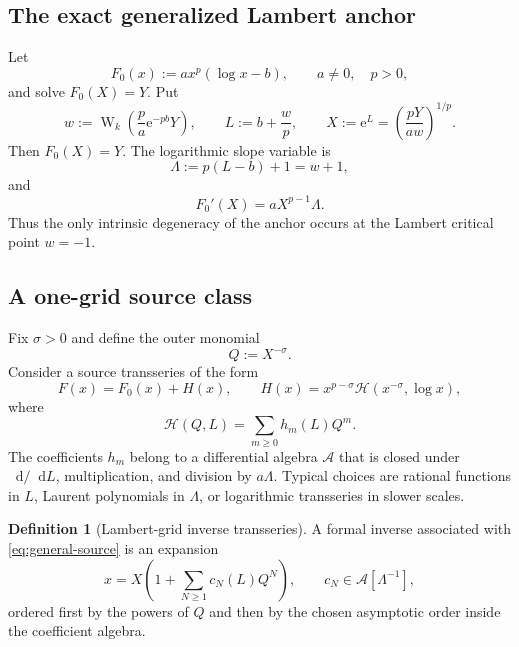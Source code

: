 \documentclass[11pt,oneside]{article}
\theoremstyle{plain}
\theoremstyle{definition}
\newtheorem{definition}[theorem]{Definition}
\theoremstyle{remark}
\newcommand{\W}{\operatorname{W}}
\newcommand{\e}{\mathrm{e}}
\newcommand{\dd}{\mathop{}\!\mathrm{d}}
\newcommand{\Acal}{\mathcal{A}}
\newcommand{\Hcal}{\mathcal{H}}
\begin{document}
\subsection{The exact generalized Lambert anchor}

Let
\begin{equation}
 F_0(x):=a x^p(\log x-b),
 \qquad a\ne0,\quad p>0,
 \label{eq:general-F0}
\end{equation}
and solve \(F_0(X)=Y\).  Put
\begin{equation}
 w:=\W_k\!\left(\frac{p}{a}\e^{-pb}Y\right),
 \qquad
 L:=b+\frac wp,
 \qquad
 X:=\e^L
      =\left(\frac{pY}{aw}\right)^{1/p}.
 \label{eq:general-anchor}
\end{equation}
Then \(F_0(X)=Y\).  The logarithmic slope variable is
\begin{equation}
 \Lambda:=p(L-b)+1=w+1,
 \label{eq:Lambda-def}
\end{equation}
and
\begin{equation}
 F_0'(X)=aX^{p-1}\Lambda.
 \label{eq:general-F0-prime}
\end{equation}
Thus the only intrinsic degeneracy of the anchor occurs at the Lambert
critical point \(w=-1\).

\subsection{A one-grid source class}

Fix \(\sigma>0\) and define the outer monomial
\begin{equation}
 Q:=X^{-\sigma}.
 \label{eq:general-Q}
\end{equation}
Consider a source transseries of the form
\begin{equation}
 F(x)=F_0(x)+H(x),
 \qquad
 H(x)=x^{p-\sigma}\Hcal(x^{-\sigma},\log x),
 \label{eq:general-source}
\end{equation}
where
\begin{equation}
 \Hcal(Q,L)=\sum_{m\ge0}h_m(L)Q^m.
 \label{eq:general-Hcal}
\end{equation}
The coefficients \(h_m\) belong to a differential algebra \(\Acal\) that is
closed under \(\dd/\dd L\), multiplication, and division by \(a\Lambda\).
Typical choices are rational functions in \(L\), Laurent polynomials in
\(\Lambda\), or logarithmic transseries in slower scales.

\begin{definition}[Lambert-grid inverse transseries]
\label{def:Lambert-grid}
A formal inverse associated with \cref{eq:general-source} is an expansion
\begin{equation}
 x
 =X\left(1+\sum_{N\ge1}c_N(L)Q^N\right),
 \qquad c_N\in\Acal[\Lambda^{-1}],
 \label{eq:general-inverse-shape}
\end{equation}
ordered first by the powers of \(Q\) and then by the chosen asymptotic order
inside the coefficient algebra.
\end{definition}
\end{document}
